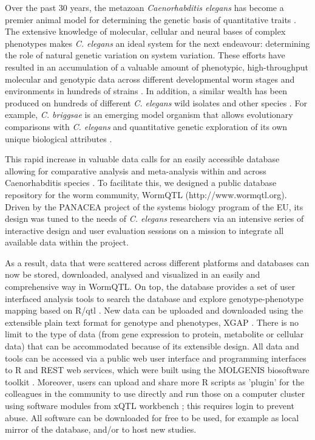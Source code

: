Over the past 30 years, the metazoan \emph{Caenorhabditis elegans} has become a premier animal model for 
determining the genetic basis of quantitative traits \cite{Gaertner:2010, Kammenga:2008}. The 
extensive knowledge of molecular, cellular and neural bases of complex phenotypes makes 
\emph{C. elegans} an ideal system for the next endeavour: determining the role of natural genetic 
variation on system variation. These efforts have resulted in an accumulation of a valuable amount 
of phenotypic, high-throughput molecular and genotypic data across different developmental worm 
stages and environments in hundreds of strains \cite{Palopoli:2008, Kammenga:2007, Rockman:2010, 
McGrath:2009, Reddy:2009, Doroszuk:2009, Li:2010, Gutteling:2007, Vinuela:2010}. In addition, a similar wealth has been 
produced on hundreds of different \emph{C. elegans} wild isolates and other species \cite{Andersen:2012}. 
For example, \emph{C. briggsae} is an emerging model organism that allows evolutionary comparisons 
with \emph{C. elegans} and quantitative genetic exploration of its own unique biological 
attributes \cite{Ross:2011}.

This rapid increase in valuable data calls for an easily accessible database allowing for 
comparative analysis and meta-analysis within and across Caenorhabditis species \cite{Swertz:2007}. To 
facilitate this, we designed a public database repository for the worm community, WormQTL 
(http://www.wormqtl.org). Driven by the PANACEA project of the systems biology program of 
the EU, its design was tuned to the needs of \emph{C. elegans} researchers via an intensive 
series of interactive design and user evaluation sessions on a mission to integrate all 
available data within the project.

As a result, data that were scattered across different platforms and databases can now be 
stored, downloaded, analysed and visualized in an easily and comprehensive way in WormQTL. 
On top, the database provides a set of user interfaced analysis tools to search the database 
and explore genotype-phenotype mapping based on R/qtl \cite{Broman:2003, Arends:2010}. New 
data can be uploaded and downloaded using the extensible plain text format for genotype and 
phenotypes, XGAP \cite{Swertz:2010a}. There is no limit to the type of data (from gene 
expression to protein, metabolite or cellular data) that can be accommodated because of its 
extensible design. All data and tools can be accessed via a public web user interface and 
programming interfaces to R and REST web services, which were built using the MOLGENIS 
biosoftware toolkit \cite{Swertz:2010b}. Moreover, users can upload and share more R 
scripts as 'plugin' for the colleagues in the community to use directly and run those on a 
computer cluster using software modules from xQTL workbench \cite{Arends:2012, Snoek:2012}; this requires 
login to prevent abuse. All software can be downloaded for free to be used, for example as 
local mirror of the database, and/or to host new studies.

